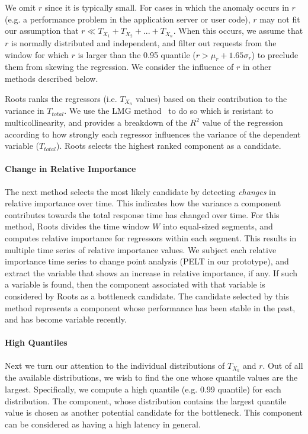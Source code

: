 We omit $r$ since it is typically small.
For cases in which the anomaly occurs in $r$ (e.g. a performance problem in the 
application server or user code), $r$ may
not fit our assumption that $r \ll T_{X_1} + T_{X_2} + ... + T_{X_n}$.  When this
occurs, we assume that $r$ is normally distributed and independent, and filter out
requests from the window for which $r$ is larger than the 0.95 quantile ($r > \mu_r + 1.65\sigma_r$)
to preclude them from skewing the regression. 
We consider the influence of $r$ in other methods described below.

Roots ranks the regressors (i.e. $T_{X_n}$ values) based on their contribution to the variance 
in $T_{total}$.  We use the LMG method~\cite{lmg80} to do so which is resistant to multicollinearity, 
and provides a breakdown of the $R^2$ value of
the regression according to how strongly each regressor influences
the variance of the dependent variable ($T_{total}$).
Roots selects the highest ranked component as a candidate.

\paragraph*{Change in Relative Importance}
The next method selects the most likely candidate by detecting \textit{changes} in relative importance
over time.
This indicates how the variance a component contributes towards the total response time has
changed over time.
For this method, Roots divides the time window $W$ into equal-sized segments,
and computes relative importance for regressors within each segment. 
This results in multiple time series of relative importance values.
We subject each relative importance time series to change point analysis (PELT in our prototype), 
and extract the variable that shows an increase in relative importance, if any.
If such a variable is found, then the component
associated with that variable is considered by Roots as a bottleneck candidate.
The candidate selected by this method represents
a component whose performance has been stable in the past, and has become variable recently.

\paragraph*{High Quantiles}
Next we turn our attention to the individual distributions of $T_{X_k}$ and $r$.
Out of all the available distributions,
we wish to find the one whose quantile values are the largest.
Specifically, we compute a high	
quantile (e.g. 0.99 quantile) for each distribution. The component, whose distribution
contains the largest quantile value
is chosen as another potential candidate for the bottleneck. This component can be considered
as having a high latency in general.

